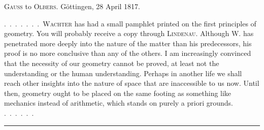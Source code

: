\clearpage{}
\begin{center}\textsc{Gauss} to \textsc{Olbers}. Göttingen, 28 April 1817.\end{center}

.\ .\ .\ .\ .\ .\ .\ \textsc{Wachter} has had a small pamphlet printed on the
first principles of geometry. You will probably receive a copy through \textsc{Lindenau}.
Although W. has penetrated more deeply into the nature of the matter
than his predecessors, his proof is no more conclusive
than any of the others. I am increasingly convinced that the
necessity of our geometry cannot be proved, at least
not  the \textbf{} understanding or  the human understanding.
Perhaps in another life we shall reach other insights into the
nature of space that are inaccessible to us now. Until then, geometry ought
to be placed on the same footing as something like mechanics instead of arithmetic, which
stands on purely a priori grounds. .\ .\ .\ .\ .\ .

\begin{center}\rule{3cm}{0.4pt}\end{center}

